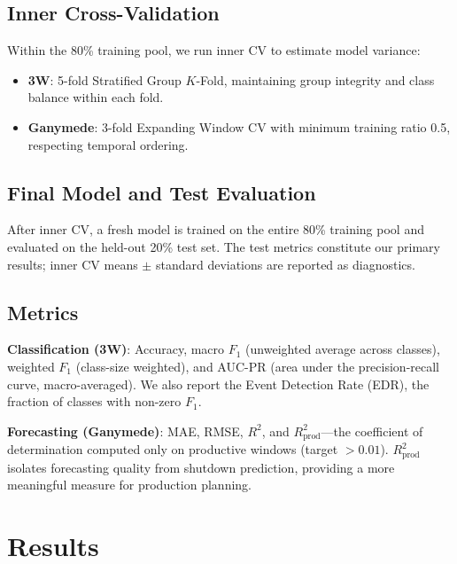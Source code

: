 \documentclass[conference]{IEEEtran}
\begin{document}
\subsection{Inner Cross-Validation}

Within the 80\% training pool, we run inner CV to estimate model variance:

\begin{itemize}
    \item \textbf{3W}: 5-fold Stratified Group $K$-Fold, maintaining group integrity and class balance within each fold.
    \item \textbf{Ganymede}: 3-fold Expanding Window CV with minimum training ratio 0.5, respecting temporal ordering.
\end{itemize}

\subsection{Final Model and Test Evaluation}

After inner CV, a fresh model is trained on the entire 80\% training pool and evaluated on the held-out 20\% test set. The test metrics constitute our primary results; inner CV means $\pm$ standard deviations are reported as diagnostics.

\subsection{Metrics}

\textbf{Classification (3W)}: Accuracy, macro $F_1$ (unweighted average across classes), weighted $F_1$ (class-size weighted), and AUC-PR (area under the precision-recall curve, macro-averaged). We also report the Event Detection Rate (EDR), the fraction of classes with non-zero $F_1$.

\textbf{Forecasting (Ganymede)}: MAE, RMSE, $R^2$, and $R^2_\text{prod}$---the coefficient of determination computed only on productive windows (target $> 0.01$). $R^2_\text{prod}$ isolates forecasting quality from shutdown prediction, providing a more meaningful measure for production planning.

\section{Results}
\label{sec:results}
\end{document}
